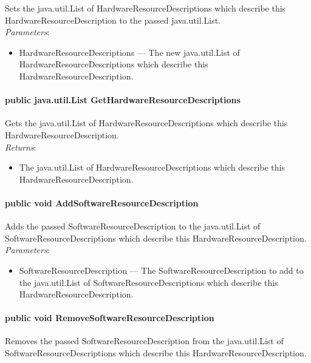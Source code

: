 \documentclass[$Date: 2003/06/26 19:29:31 $]{glabarticle}
\begin{document}
Sets the java.util.List of HardwareResourceDescriptions which describe this
HardwareResourceDescription to the passed java.util.List. \\

\textit{Parameters}:
\begin{itemize}
\item[] HardwareResourceDescriptions --- The new java.util.List of HardwareResourceDescriptions which describe 
this HardwareResourceDescription.
\end{itemize}

\paragraph{public java.util.List GetHardwareResourceDescriptions}

Gets the java.util.List of HardwareResourceDescriptions which describe this
HardwareResourceDescription. \\

\textit{Returns}:
\begin{itemize}
\item[] The java.util.List of HardwareResourceDescriptions which describe this 
HardwareResourceDescription.
\end{itemize}

\paragraph{public void AddSoftwareResourceDescription}

Adds the passed SoftwareResourceDescription to the java.util.List of
SoftwareResourceDescriptions which describe this
HardwareResourceDescription. \\

\textit{Parameters}:
\begin{itemize}
\item[] SoftwareResourceDescription --- The SoftwareResourceDescription to add to the java.util.List of 
SoftwareResourceDescriptions which describe this HardwareResourceDescription.
\end{itemize}
 
\paragraph{public void RemoveSoftwareResourceDescription}

Removes the passed SoftwareResourceDescription from the java.util.List of
SoftwareResourceDescriptions which describe this
HardwareResourceDescription. \\
\end{document}
